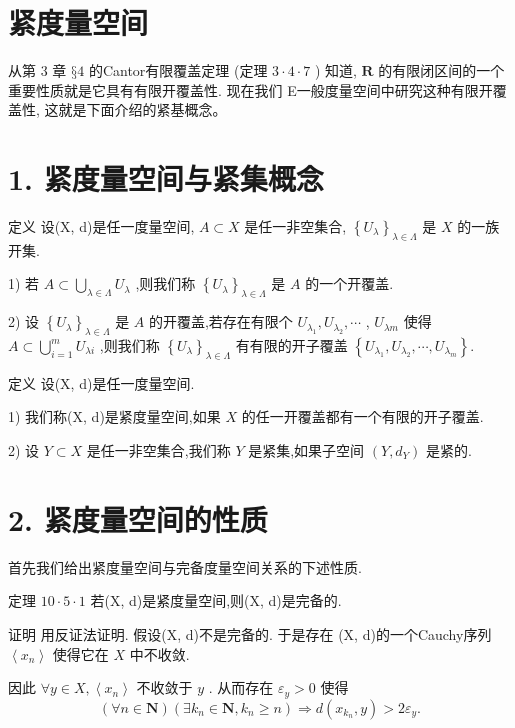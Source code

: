 \section{紧度量空间}

从第 3 章 $§4$ 的Cantor有限覆盖定理 (定理 $3 \cdot  4 \cdot  7$ ) 知道, $\mathbf{R}$ 的有限闭区间的一个重要性质就是它具有有限开覆盖性. 现在我们 E一般度量空间中研究这种有限开覆盖性, 这就是下面介绍的紧基概念。

\section*{1. 紧度量空间与紧集概念}

定义 设(X, d)是任一度量空间, $A \subset  X$ 是任一非空集合, ${\left\{  {U}_{\lambda }\right\}  }_{\lambda  \in  \Lambda }$ 是 $X$ 的一族开集.

1) 若 $A \subset  \mathop{\bigcup }\limits_{{\lambda  \in  \Lambda }}{U}_{\lambda }$ ,则我们称 ${\left\{  {U}_{\lambda }\right\}  }_{\lambda  \in  \Lambda }$ 是 $A$ 的一个开覆盖.

2) 设 ${\left\{  {U}_{\lambda }\right\}  }_{\lambda  \in  \Lambda }$ 是 $A$ 的开覆盖,若存在有限个 ${U}_{{\lambda }_{1}},{U}_{{\lambda }_{2}},\cdots$ , ${U}_{\lambda m}$ 使得 $A \subset  \mathop{\bigcup }\limits_{{i = 1}}^{m}{U}_{\lambda i}$ ,则我们称 ${\left\{  {U}_{\lambda }\right\}  }_{\lambda  \in  \Lambda }$ 有有限的开子覆盖 $\left\{  {{U}_{{\lambda }_{1}},{U}_{{\lambda }_{2}},\cdots ,{U}_{{\lambda }_{m}}}\right\}  .$

定义 设(X, d)是任一度量空间.

1) 我们称(X, d)是紧度量空间,如果 $X$ 的任一开覆盖都有一个有限的开子覆盖.

2) 设 $Y \subset  X$ 是任一非空集合,我们称 $Y$ 是紧集,如果子空间 $\left( {Y,{d}_{Y}}\right)$ 是紧的.

\section*{2. 紧度量空间的性质}

首先我们给出紧度量空间与完备度量空间关系的下述性质.

定理 ${10} \cdot  5 \cdot  1$ 若(X, d)是紧度量空间,则(X, d)是完备的.

证明 用反证法证明. 假设(X, d)不是完备的. 于是存在 (X, d)的一个Cauchy序列 $\left\langle  {x}_{n}\right\rangle$ 使得它在 $X$ 中不收敛.

因此 $\forall y \in  X,\left\langle  {x}_{n}\right\rangle$ 不收敛于 $y$ . 从而存在 ${\varepsilon }_{y} > 0$ 使得
$$\left( {\forall n \in  \mathbf{N}}\right) \left( {\exists {k}_{n} \in  \mathbf{N},{k}_{n} \geq  n}\right)  \Rightarrow  d\left( {{x}_{{k}_{n}},y}\right)  > 2{\varepsilon }_{y}.$$

